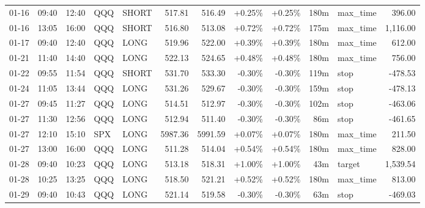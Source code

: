 \documentclass[11pt,a4paper,twoside]{article}
\begin{document}
\begin{center}
\begin{longtable}{>{\color{txtmain}}l l l l l r r r r r >{\color{txtmain}}l r}
01-16 & 09:40 & 12:40 & QQQ & SHORT & 517.81 & 516.49 & \textcolor{wingreen}{+0.25\%} & \textcolor{wingreen}{+0.25\%} & 180m & max\_time & \textcolor{wingreen}{396.00} \\
01-16 & 13:05 & 16:00 & QQQ & SHORT & 516.80 & 513.08 & \textcolor{wingreen}{+0.72\%} & \textcolor{wingreen}{+0.72\%} & 175m & max\_time & \textcolor{wingreen}{1,116.00} \\
01-17 & 09:40 & 12:40 & QQQ & LONG & 519.96 & 522.00 & \textcolor{wingreen}{+0.39\%} & \textcolor{wingreen}{+0.39\%} & 180m & max\_time & \textcolor{wingreen}{612.00} \\
01-21 & 11:40 & 14:40 & QQQ & LONG & 522.13 & 524.65 & \textcolor{wingreen}{+0.48\%} & \textcolor{wingreen}{+0.48\%} & 180m & max\_time & \textcolor{wingreen}{756.00} \\
01-22 & 09:55 & 11:54 & QQQ & SHORT & 531.70 & 533.30 & \textcolor{lossred}{-0.30\%} & \textcolor{lossred}{-0.30\%} & 119m & stop & \textcolor{lossred}{-478.53} \\
01-24 & 11:05 & 13:44 & QQQ & LONG & 531.26 & 529.67 & \textcolor{lossred}{-0.30\%} & \textcolor{lossred}{-0.30\%} & 159m & stop & \textcolor{lossred}{-478.13} \\
01-27 & 09:45 & 11:27 & QQQ & LONG & 514.51 & 512.97 & \textcolor{lossred}{-0.30\%} & \textcolor{lossred}{-0.30\%} & 102m & stop & \textcolor{lossred}{-463.06} \\
01-27 & 11:30 & 12:56 & QQQ & LONG & 512.94 & 511.40 & \textcolor{lossred}{-0.30\%} & \textcolor{lossred}{-0.30\%} & 86m & stop & \textcolor{lossred}{-461.65} \\
01-27 & 12:10 & 15:10 & SPX & LONG & 5987.36 & 5991.59 & \textcolor{wingreen}{+0.07\%} & \textcolor{wingreen}{+0.07\%} & 180m & max\_time & \textcolor{wingreen}{211.50} \\
01-27 & 13:00 & 16:00 & QQQ & LONG & 511.28 & 514.04 & \textcolor{wingreen}{+0.54\%} & \textcolor{wingreen}{+0.54\%} & 180m & max\_time & \textcolor{wingreen}{828.00} \\
01-28 & 09:40 & 10:23 & QQQ & LONG & 513.18 & 518.31 & \textcolor{wingreen}{+1.00\%} & \textcolor{wingreen}{+1.00\%} & 43m & target & \textcolor{wingreen}{1,539.54} \\
01-28 & 10:25 & 13:25 & QQQ & LONG & 518.50 & 521.21 & \textcolor{wingreen}{+0.52\%} & \textcolor{wingreen}{+0.52\%} & 180m & max\_time & \textcolor{wingreen}{813.00} \\
01-29 & 09:40 & 10:43 & QQQ & LONG & 521.14 & 519.58 & \textcolor{lossred}{-0.30\%} & \textcolor{lossred}{-0.30\%} & 63m & stop & \textcolor{lossred}{-469.03} \\

\end{longtable}
\end{center}
\end{document}

